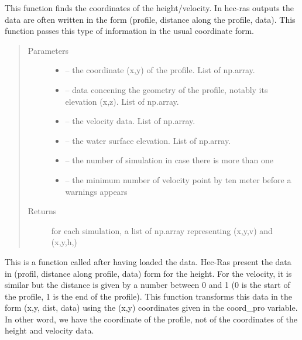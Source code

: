 \documentclass[letterpaper,10pt,english]{sphinxmanual}
\begin{document}

\begin{fulllineitems}
\label{\detokenize{index:src.Hec_ras06.find_coord_height_velocity}}
This function finds the coordinates of the height/velocity. In hec-ras outputs the data are often written in the
form (profile, distance along the profile, data). This function passes this type of information in the usual
coordinate form.
\begin{quote}\begin{description}
\item[{Parameters}] \leavevmode\begin{itemize}
\item {} 
 -- the coordinate (x,y) of the profile. List of np.array.

\item {} 
 -- data concening the geometry of the profile, notably its elevation (x,z). List of np.array.

\item {} 
 -- the velocity data. List of np.array.

\item {} 
 -- the water surface elevation. List of np.array.

\item {} 
 -- the number of simulation in case there is more than one

\item {} 
 -- the minimum number of velocity point by ten meter before a warnings appears

\end{itemize}

\item[{Returns}] \leavevmode
for each simulation, a list of np.array representing (x,y,v) and (x,y,h,)

\end{description}\end{quote}


This is a function called after having loaded the data. Hec-Ras present the data in (profil, distance along
profile, data) form for the height. For the velocity, it is similar but the distance is given by a number between
0 and 1 (0 is the start of the profile, 1 is the end of the profile). This function transforms this data in the form
(x,y, dist, data) using the (x,y) coordinates given in the coord\_pro variable. In other word,  we have the
coordinate of the profile, not of the coordinates of the height and velocity data.


\end{fulllineitems}
\end{document}
